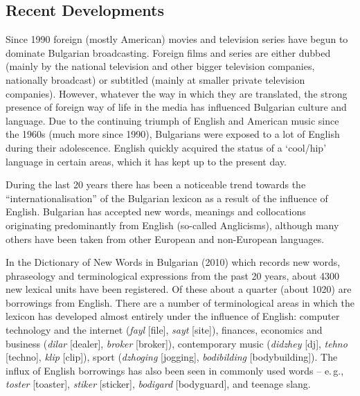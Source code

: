 \documentclass[]{../../metanetpaper}
\begin{document}
\begin{multicols}{2}
\subsection{Recent Developments}

Since 1990 foreign (mostly American) movies and television series have begun to dominate Bulgarian broadcasting. Foreign films and series are either dubbed (mainly by the national television and other bigger television companies, nationally broadcast) or subtitled (mainly at smaller private television companies). However, whatever the way in which they are translated, the strong presence of foreign way of life in the media has influenced Bulgarian culture and language. Due to the continuing triumph of English and American music since the 1960s (much more since 1990), Bulgarians were exposed to a lot of English during their adolescence. English quickly acquired the status of a ‘cool/hip’ language in certain areas, which it has kept up to the present day. 

During the last 20 years there has been a noticeable trend towards the ``internationalisation'' of the Bulgarian lexicon as a result of the influence of English. Bulgarian has accepted new words, meanings and collocations originating predominantly from English (so-called Anglicisms), although many others have been taken from other European and non-European languages.


In the Dictionary of New Words in Bulgarian (2010)  \cite{NWDict} which records new words, phraseology and terminological expressions from the past 20 years, about 4300 new lexical units have been registered. Of these about a quarter (about 1020) are borrowings from English. There are a number of terminological areas in which the lexicon has developed almost entirely under the influence of English: computer technology and the internet (\textit{{fayl}} [file], \textit{{sayt}} [site]), finances, economics and business (\textit{{dilar}} [dealer], \textit{{broker}} [broker]), contemporary music (\textit{{didzhey}} [dj], \textit{{tehno}} [techno], \textit{{klip}} [clip]), sport (\textit{{dzhoging}} [jogging], \textit{{bodibilding}} [bodybuilding]). The influx of English borrowings has also been seen in commonly used words -- e.\,g., \textit{{toster}} [toaster], \textit{{stiker}} [sticker], \textit{{bodigard}} [bodyguard], and teenage slang.


\end{multicols}
\end{document}
